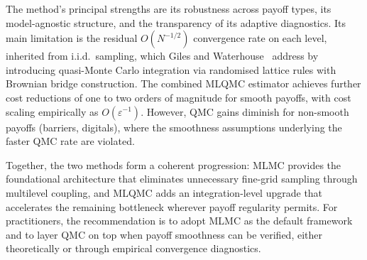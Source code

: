 \documentclass[11pt]{article}
\begin{document}
The method's principal strengths are its robustness across payoff types, its model-agnostic structure, and the transparency of its adaptive diagnostics. Its main limitation is the residual $O(N^{-1/2})$ convergence rate on each level, inherited from i.i.d.\ sampling, which Giles and Waterhouse~\cite{giles2009} address by introducing quasi-Monte Carlo integration via randomised lattice rules with Brownian bridge construction. The combined MLQMC estimator achieves further cost reductions of one to two orders of magnitude for smooth payoffs, with cost scaling empirically as $O(\varepsilon^{-1})$. However, QMC gains diminish for non-smooth payoffs (barriers, digitals), where the smoothness assumptions underlying the faster QMC rate are violated.

Together, the two methods form a coherent progression: MLMC provides the foundational architecture that eliminates unnecessary fine-grid sampling through multilevel coupling, and MLQMC adds an integration-level upgrade that accelerates the remaining bottleneck wherever payoff regularity permits. For practitioners, the recommendation is to adopt MLMC as the default framework and to layer QMC on top when payoff smoothness can be verified, either theoretically or through empirical convergence diagnostics.
\end{document}
